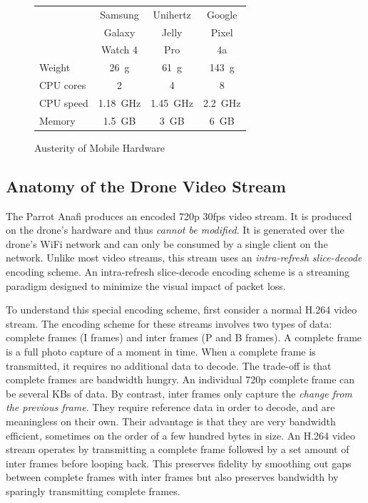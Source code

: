 \begin{figure}
\centering
\begin{tabular}{|l|c|c|c|}
\hline
    & Samsung & Unihertz & Google \\
    & Galaxy & Jelly & Pixel\\
    & Watch 4 & Pro & 4a \\
\hline
Weight & 26~g & 61~g & 143~g\\
CPU cores & 2 & 4 & 8 \\
CPU speed & 1.18~GHz&1.45~GHz & 2.2~GHz\\
Memory & 1.5~GB & 3~GB & 6~GB\\
\hline
\end{tabular}
\caption{Austerity of Mobile Hardware}
\label{tab:austerity}
\end{figure}

\subsection{Anatomy of the Drone Video Stream}
\label{sec:anatomy-drone-stream}
The Parrot Anafi produces an encoded 720p 30fps video stream. It is produced on the drone's hardware and thus \textit{cannot be modified}. It is generated over the drone's WiFi network and can only be consumed by a single client on the network. Unlike most video streams, this stream uses an \textit{intra-refresh slice-decode} encoding scheme. An intra-refresh slice-decode encoding scheme is a streaming paradigm designed to minimize the visual impact of packet loss. 

To understand this special encoding scheme, first consider a normal H.264 video stream. The encoding scheme for these streams involves two types of data: complete frames (I frames) and inter frames (P and B frames). A complete frame is a full photo capture of a moment in time. When a complete frame is transmitted, it requires no additional data to decode. The trade-off is that complete frames are bandwidth hungry. An individual 720p complete frame can be several KBs of data. By contrast, inter frames only capture the \textit{change from the previous frame}. They require reference data in order to decode, and are meaningless on their own. Their advantage is that they are very bandwidth efficient, sometimes on the order of a few hundred bytes in size. An H.264 video stream operates by transmitting a complete frame followed by a set amount of inter frames before looping back. This preserves fidelity by smoothing out gaps between complete frames with inter frames but also preserves bandwidth by sparingly transmitting complete frames.

